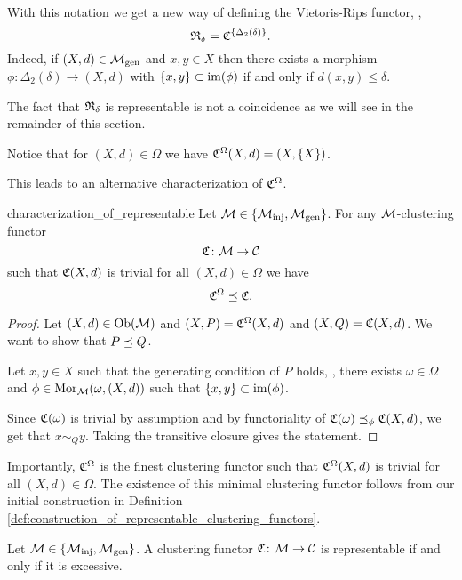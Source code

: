 \begin{example}{}{}
With this notation we get a new way of defining the Vietoris-Rips functor, \ie,
$$
\mathfrak{R}_\delta = \mathfrak{C}^{\{\Delta_2(\delta)\}}.
$$
Indeed, if $(X,d) \in {\mathcal{M}_\mathrm{gen}}$ and $x,y \in X$ then there exists a morphism ${\phi \colon \Delta_2(\delta) \to (X,d)}$ with $\{x,y\} \subset \operatorname*{im}(\phi)$ if and only if $d(x,y) \leq \delta$.
\end{example}
The fact that $\mathfrak{R}_\delta$ is representable is not a coincidence as we will see in the remainder of this section.
\begin{myremark}{\cite[Rem.~6.3]{Carlsson2010}}{}
Notice that for $(X,d) \in \Omega$ we have $\mathfrak{C}^\Omega(X,d) = (X, \{X\})$.
\end{myremark}

This leads to an alternative characterization of $\mathfrak{C}^\Omega$.

\begin{proposition}{}{characterization_of_representable}
Let $\mathcal{M} \in \{{\mathcal{M}_\mathrm{inj}}, {\mathcal{M}_\mathrm{gen}}\}$. For any $\mathcal{M}$-clustering functor
$$
\mathfrak{C}\colon \mathcal{M} \to \mathcal{C}
$$
such that $\mathfrak{C}(X,d)$ is trivial for all $(X,d) \in \Omega$ we have
$$
\mathfrak{C}^\Omega \preceq \mathfrak{C}.
$$
\end{proposition}

\begin{proof}
Let $(X,d) \in \mathrm {Ob}(\mathcal{M})$ and $(X,P) = \mathfrak{C}^\Omega(X,d)$ and $(X,Q) = \mathfrak{C}(X,d)$. We want to show that $P \preceq Q$.

Let $x,y \in X$ such that the generating condition of $P$ holds, \ie, there exists $\omega \in \Omega$ and $\phi \in \mathrm {Mor}_{\mathcal{M}}(\omega, (X,d))$ such that $\{x,y\} \subset \operatorname*{im}(\phi)$.

Since $\mathfrak{C}(\omega)$ is trivial by assumption and by functoriality of $\mathfrak{C}(\omega) \preceq_\phi \mathfrak{C}(X,d)$, we get that $x \sim_Q y$. Taking the transitive closure gives the statement.
\end{proof}

Importantly, $\mathfrak{C}^\Omega$ is the finest clustering functor such that $\mathfrak{C}^\Omega(X,d)$ is trivial for all $(X,d) \in \Omega$. The existence of this minimal clustering functor follows from our initial construction in Definition \ref{def:construction_of_representable_clustering_functors}.

\begin{theorem}{\cite[Thm.~6.2]{Carlsson2010}}{}
Let $\mathcal{M} \in \{{\mathcal{M}_\mathrm{inj}}, {\mathcal{M}_\mathrm{gen}}\}$. A clustering functor $\mathfrak{C}\colon \mathcal{M} \to \mathcal{C}$ is representable if and only if it is excessive.
\end{theorem}

